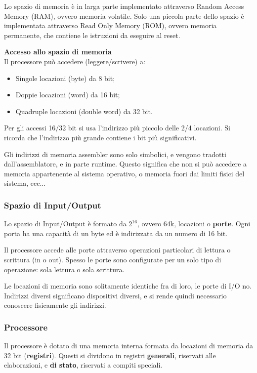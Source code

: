 \documentclass[a4paper,11pt]{article}
\begin{document}
\par\smallskip

Lo spazio di memoria è in larga parte implementato attraverso Random Access Memory (RAM), ovvero memoria volatile.
Solo una piccola parte dello spazio è implementata attraverso Read Only Memory (ROM), ovvero memoria permanente, che contiene le istruzioni da eseguire al reset.

\par\medskip
\noindent
\textbf{\textsf{Accesso allo spazio di memoria}} \\
Il processore può accedere (leggere/scrivere) a:
\begin{itemize}
	\item Singole locazioni (byte) da 8 bit;
	\item Doppie locazioni (word) da 16 bit;
	\item Quadruple locazioni (double word) da 32 bit.
\end{itemize}

Per gli accessi 16/32 bit si usa l'indirizzo più piccolo delle 2/4 locazioni.
Si ricorda che l'indirizzo più grande contiene i bit più significativi.

Gli indirizzi di memoria assembler sono solo simbolici, e vengono tradotti dall'assemblatore, e in parte runtime.
Questo significa che non si può accedere a memoria appartenente al sistema operativo, o memoria fuori dai limiti fisici del sistema, ecc...

\subsubsection{Spazio di Input/Output}
Lo spazio di Input/Output è formato da $2^{16}$, ovvero 64k, locazioni o \textbf{porte}.
Ogni porta ha una capacità di un byte ed è indirizzata da un numero di 16 bit.

Il processore accede alle porte attraverso operazioni particolari di lettura o scrittura (in o out).
Spesso le porte sono configurate per un solo tipo di operazione: sola lettura o sola scrittura.

\par\smallskip

Le locazioni di memoria sono solitamente identiche fra di loro, le porte di I/O no.
Indirizzi diversi significano dispositivi diversi, e si rende quindi necessario conoscere fisicamente gli indirizzi.

\subsubsection{Processore}
Il processore è dotato di una memoria interna formata da locazioni di memoria da 32 bit (\textbf{registri}).
Questi si dividono in registri \textbf{generali}, riservati alle elaborazioni, e \textbf{di stato}, riservati a compiti speciali.
\end{document}

